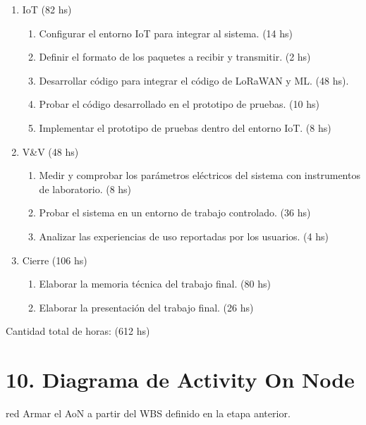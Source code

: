 \documentclass[
11pt, %
codirector, %
]{plan}
\begin{document}
\begin{enumerate}
\item IoT (82 hs)
	\begin{enumerate}
		\item Configurar el entorno IoT para integrar al sistema. (14 hs)
		\item Definir el formato de los paquetes a recibir y transmitir. (2 hs)
		\item Desarrollar código para integrar el código de LoRaWAN y ML. (48 hs).
		\item Probar el código desarrollado en el prototipo de pruebas. (10 hs)
		\item Implementar el prototipo de pruebas dentro del entorno IoT. (8 hs)
	\end{enumerate}
	
\item V\&V (48 hs)
	\begin{enumerate}
		\item Medir y comprobar los parámetros eléctricos del sistema con instrumentos de laboratorio. (8 hs)
		\item Probar el sistema en un entorno de trabajo controlado. (36 hs)
		\item Analizar las experiencias de uso reportadas por los usuarios. (4 hs)
	\end{enumerate}
	
\item Cierre (106 hs)
	\begin{enumerate}
		\item Elaborar la memoria técnica del trabajo final. (80 hs)
		\item Elaborar la presentación del trabajo final. (26 hs)
	\end{enumerate}
\end{enumerate}

Cantidad total de horas: (612 hs)

\section{10. Diagrama de Activity On Node}
\label{sec:AoN}

\begin{consigna}{red}
Armar el AoN a partir del WBS definido en la etapa anterior. 



\end{consigna}
\end{document}
